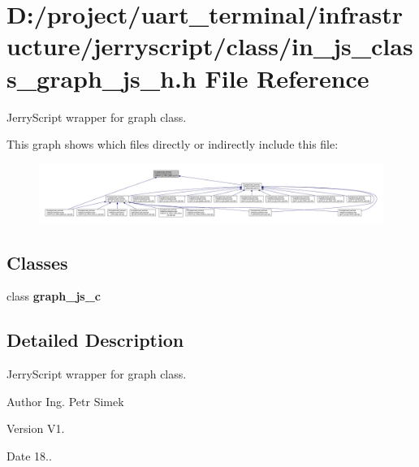\section{D\+:/project/uart\+\_\+terminal/infrastructure/jerryscript/class/in\+\_\+js\+\_\+class\+\_\+graph\+\_\+js\+\_\+h.h File Reference}
\label{in__js__class__graph__js__h_8h}


Jerry\+Script wrapper for graph class.  


This graph shows which files directly or indirectly include this file\+:
\nopagebreak
\begin{figure}[H]
\begin{center}
\leavevmode
\includegraphics[width=350pt]{in__js__class__graph__js__h_8h__dep__incl}
\end{center}
\end{figure}
\subsection*{Classes}
\begin{DoxyCompactItemize}
\item 
class \textbf{ graph\+\_\+js\+\_\+c}
\end{DoxyCompactItemize}


\subsection{Detailed Description}
Jerry\+Script wrapper for graph class. 

\begin{DoxyAuthor}{Author}
Ing. Petr Simek 
\end{DoxyAuthor}
\begin{DoxyVersion}{Version}
V1. 
\end{DoxyVersion}
\begin{DoxyDate}{Date}
18.. 
\end{DoxyDate}
